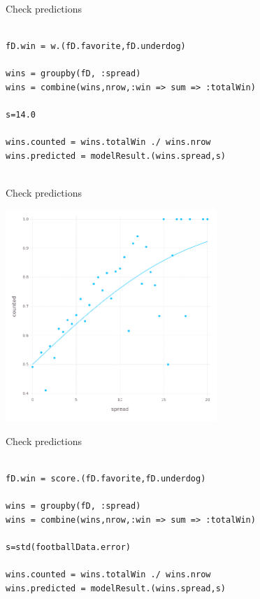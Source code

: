 \documentclass{beamer}
\begin{document}
\begin{frame}[fragile]{Check predictions}
  \begin{lstlisting}

fD.win = w.(fD.favorite,fD.underdog)

wins = groupby(fD, :spread)
wins = combine(wins,nrow,:win => sum => :totalWin)

s=14.0

wins.counted = wins.totalWin ./ wins.nrow
wins.predicted = modelResult.(wins.spread,s)
    
\end{lstlisting}
\end{frame}


\begin{frame}{Check predictions}
  \begin{center}
    \includegraphics[width=8cm]{prediction.png}
\end{center}
  \end{frame}


\begin{frame}[fragile]{Check predictions}
  \begin{lstlisting}

fD.win = score.(fD.favorite,fD.underdog)

wins = groupby(fD, :spread)
wins = combine(wins,nrow,:win => sum => :totalWin)

s=std(footballData.error)

wins.counted = wins.totalWin ./ wins.nrow
wins.predicted = modelResult.(wins.spread,s)
    
\end{lstlisting}
\end{frame}
\end{document}
